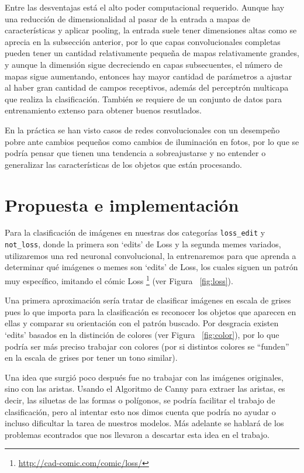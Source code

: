 \documentclass[spanish,11pt,letterpaper]{article}
\begin{document}
Entre las desventajas está el alto poder computacional requerido. Aunque hay una
reducción de dimensionalidad al pasar de la entrada a mapas de características y
aplicar pooling, la entrada suele tener dimensiones altas como se aprecia en la subsección
anterior, por lo que capas convolucionales completas pueden tener un cantidad
relativamente pequeña de mapas relativamente grandes, y aunque la dimensión sigue
decreciendo en capas subsecuentes, el número de mapas sigue aumentando, entonces
hay mayor cantidad de parámetros a ajustar al haber gran cantidad de campos receptivos,
además del perceptrón multicapa que realiza la clasificación. También se requiere
de un conjunto de datos para entrenamiento extenso para obtener buenos resutlados.

En la práctica se han visto casos de redes convolucionales con un desempeño pobre
ante cambios pequeños como cambios de iluminación en fotos, por lo que se podría
pensar que tienen una tendencia a sobreajustarse y no entender o generalizar las
características de los objetos que están procesando\cite{limitations}.

\section{Propuesta e implementación}

Para la clasificación de imágenes en nuestras dos categorías \texttt{loss\_edit}
y \texttt{not\_loss}, donde la primera son `edits' de Loss y la segunda memes
variados, utilizaremos una red neuronal convolucional, la entrenaremos para que
aprenda a determinar qué imágenes o memes son `edits' de Loss, los cuales siguen
un patrón muy específico, imitando el cómic Loss%
\footnote{\url{http://cad-comic.com/comic/loss/}} (ver Figura ~\ref{fig:loss}).

Una primera aproximación sería tratar de clasificar imágenes en escala de grises
pues lo que importa para la clasificación es reconocer los objetos que aparecen
en ellas y comparar su orientación con el patrón buscado. Por desgracia existen
`edits' basados en la distinción de colores (ver Figura ~\ref{fig:color}), por lo
que podría ser más preciso trabajar con colores (por si distintos colores se
``funden'' en la escala de grises por tener un tono similar).

Una idea que surgió poco después fue no trabajar con las imágenes originales, sino
con las aristas. Usando el Algoritmo de Canny para extraer las aristas, es decir,
las siluetas de las formas o polígonos, se podría facilitar el trabajo de
clasificación, pero al intentar esto nos dimos cuenta que podría no ayudar o
incluso dificultar la tarea de nuestros modelos. Más adelante se hablará de los problemas
econtrados que nos llevaron a descartar esta idea en el trabajo.
\end{document}
